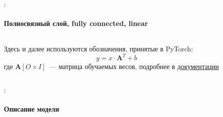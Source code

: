 \documentclass{beamer}
\newcommand{\mtx}[1]{\boldsymbol{#1}}
\begin{document}
\begin{frame}{\secname : \subsecname}
  \framesubtitle{Полносвязный слой, fully connected, linear}
  \begin{columns}

    \begin{column}{0.5\textwidth}
      Здесь и далее используются обозначения, принятые в PyTorch:
      $$
      y = x \cdot \mtx{A}^T + b
      $$
      где $\mtx{A}[O \times I]$~--- матрица обучаемых весов,
      подробнее в
      \href{https://docs.pytorch.org/docs/stable/generated/torch.nn.Linear.html}{документации}

    \end{column}

    \begin{column}{0.5\textwidth}
      \begin{center}
      \end{center}
    \end{column}

  \end{columns}
\end{frame}

\begin{frame}[fragile]{\secname : \subsecname}
  \framesubtitle{Описание модели}
  \inputminted[firstline=19,lastline=25]{python}{linear_regression_1/linear_regression_1.py}
\end{frame}
\end{document}
